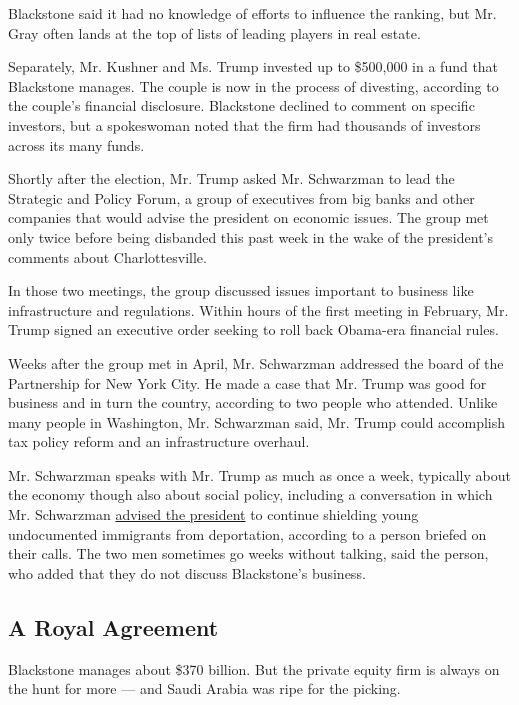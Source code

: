 Blackstone said it had no knowledge of efforts to influence the ranking,
but Mr. Gray often lands at the top of lists of leading players in real
estate.

Separately, Mr. Kushner and Ms. Trump invested up to \$500,000 in a fund
that Blackstone manages. The couple is now in the process of divesting,
according to the couple's financial disclosure. Blackstone declined to
comment on specific investors, but a spokeswoman noted that the firm had
thousands of investors across its many funds.

Shortly after the election, Mr. Trump asked Mr. Schwarzman to lead the
Strategic and Policy Forum, a group of executives from big banks and
other companies that would advise the president on economic issues. The
group met only twice before being disbanded this past week in the wake
of the president's comments about Charlottesville.

In those two meetings, the group discussed issues important to business
like infrastructure and regulations. Within hours of the first meeting
in February, Mr. Trump signed an executive order seeking to roll back
Obama-era financial rules.

Weeks after the group met in April, Mr. Schwarzman addressed the board
of the Partnership for New York City. He made a case that Mr. Trump was
good for business and in turn the country, according to two people who
attended. Unlike many people in Washington, Mr. Schwarzman said, Mr.
Trump could accomplish tax policy reform and an infrastructure overhaul.

Mr. Schwarzman speaks with Mr. Trump as much as once a week, typically
about the economy though also about social policy, including a
conversation in which Mr. Schwarzman
\href{https://www.nytimes3xbfgragh.onion/2017/04/22/us/politics/donald-trump-white-house.html?mcubz=1}{advised
the president} to continue shielding young undocumented immigrants from
deportation, according to a person briefed on their calls. The two men
sometimes go weeks without talking, said the person, who added that they
do not discuss Blackstone's business.

\hypertarget{a-royal-agreement}{%
\subsection{A Royal Agreement}\label{a-royal-agreement}}

Blackstone manages about \$370 billion. But the private equity firm is
always on the hunt for more --- and Saudi Arabia was ripe for the
picking.


